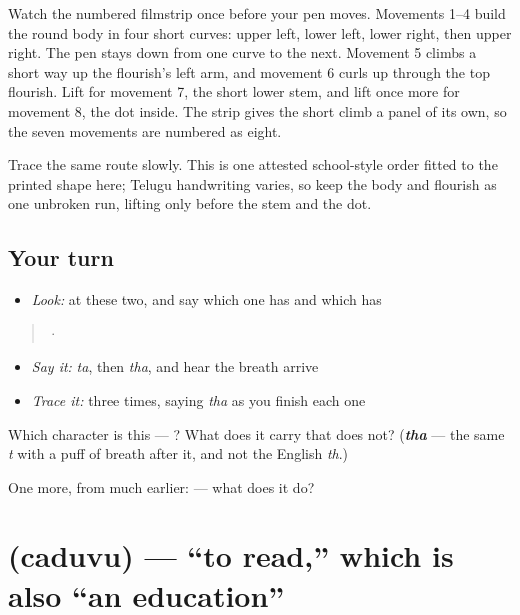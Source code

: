 Watch the numbered filmstrip once before your pen moves. Movements 1–4 build the round body in four short curves: upper left, lower left, lower right, then upper right. The pen stays down from one curve to the next. Movement 5 climbs a short way up the flourish's left arm, and movement 6 curls up through the top flourish. Lift for movement 7, the short lower stem, and lift once more for movement 8, the dot inside. The strip gives the short climb a panel of its own, so the seven movements are numbered as eight.

Trace the same route slowly. This is one attested school-style order fitted to the printed shape here; Telugu handwriting varies, so keep the body and flourish as one unbroken run, lifting only before the stem and the dot.

\subsection*{Your turn}
\begin{itemize}
\raggedright
  \item \emph{Look:} at these two, and say which one has  and which has 
\end{itemize}

\begin{quote}
  ·  
\end{quote}

\begin{itemize}
\raggedright
  \item \emph{Say it:} \emph{ta}, then \emph{tha}, and hear the breath arrive
  \item \emph{Trace it:}  three times, saying \emph{tha} as you finish each one
\end{itemize}

\begin{tcolorbox}[breakable,colback=teal!4,colframe=teal!35!black,title={Before you move on}]
Which character is this — ? What does it carry that  does not? (\emph{\textbf{tha}} — the same \emph{t} with a puff of breath after it, and not the English \emph{th}.)

One more, from much earlier:  — what does it do?
\end{tcolorbox}
\section[\texorpdfstring{\te{చదువు} (caduvu)}{చదువు (caduvu)}]{ (caduvu) — \textquotedblleft{}to read,\textquotedblright{} which is also \textquotedblleft{}an education\textquotedblright{}}

